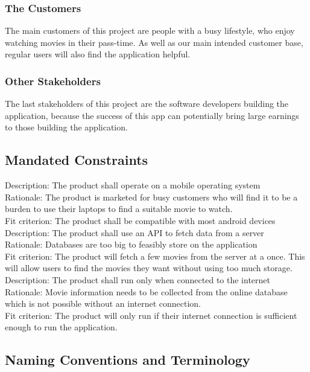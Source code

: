 \documentclass[12pt, titlepage]{article}
\begin{document}
\subsubsection{The Customers}
The main customers of this project are people with a busy lifestyle, who enjoy watching movies in their pass-time. As well as our main intended customer base, regular users will also find the application helpful.

\subsubsection{Other Stakeholders}

The last stakeholders of this project are the software developers building the application, because the success of this app can potentially bring large earnings to those building the application. 

\subsection{Mandated Constraints}
Description:  The product shall operate on a mobile operating system\\
Rationale: The product is marketed for busy customers who will find it to be a burden to use their laptops to find a suitable movie to watch.\\
Fit criterion: The product shall be compatible with most android devices\\

Description:  The product shall use an API to fetch data from a server\\
Rationale: Databases are too big to feasibly store on the application\\
Fit criterion: The product will fetch a few movies from the server at a once. This will allow users to find the movies they want without using too much storage.\\

Description: The product shall run only when connected to the internet\\
Rationale: Movie information needs to be collected from the online database which is not possible without an internet connection.\\
Fit criterion: The product will only run if their internet connection is sufficient enough to run the application.\\

\subsection{Naming Conventions and Terminology}
\end{document}
